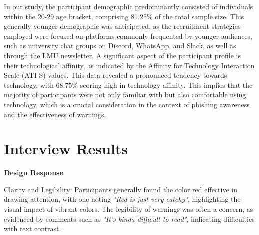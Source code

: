 \documentclass[
  a4paper,  %
  twoside,  %
  bibliography=totoc,
  headsepline,
  cleardoublepage=empty,
  parskip=half,
  draft=false
]{scrbook}
\begin{document}
In our study, the participant demographic predominantly consisted of individuals within the 20-29 age bracket, comprising 81.25\% of the total sample size. This generally younger demographic was anticipated, as the recruitment strategies employed were focused on platforms commonly frequented by younger audiences, such as university chat groups on Discord, WhatsApp, and Slack, as well as through the LMU newsletter.
A significant aspect of the participant profile is their technological affinity, as indicated by the Affinity for Technology Interaction Scale (ATI-S) values. This data revealed a pronounced tendency towards technology, with 68.75\% scoring high in technology affinity. This implies that the majority of participants were not only familiar with but also comfortable using technology, which is a crucial consideration in the context of phishing awareness and the effectiveness of warnings. \par

\section{Interview Results}

\textbf{Design Response}


Clarity and Legibility: Participants generally found the color red effective in drawing attention, with one noting \textit{"Red is just very catchy"}, highlighting the visual impact of vibrant colors. The legibility of warnings was often a concern, as evidenced by comments such as \textit{"It's kinda difficult to read"}, indicating difficulties with text contrast. %
    
\end{document}
